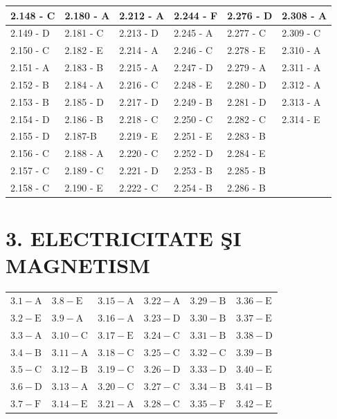 \documentclass[10pt]{article}
\begin{document}
\begin{center}
\begin{tabular}{|l|l|l|l|l|l|}
\hline
2.148 - C & 2.180 - A & 2.212 - A & 2.244 - F & 2.276 - D & 2.308 - A \\
\hline
2.149 - D & 2.181 - C & 2.213 - D & 2.245 - A & 2.277 - C & 2.309 - C \\
\hline
2.150 - C & 2.182 - E & 2.214 - A & 2.246 - C & 2.278 - E & 2.310 - A \\
\hline
2.151 - A & 2.183 - B & 2.215 - A & 2.247 - D & 2.279 - A & 2.311 - A \\
\hline
2.152 - B & 2.184 - A & 2.216 - C & 2.248 - E & 2.280 - D & 2.312 - A \\
\hline
2.153 - B & 2.185 - D & 2.217 - D & 2.249 - B & 2.281 - D & 2.313 - A \\
\hline
2.154 - D & 2.186 - B & 2.218 - C & 2.250 - C & 2.282 - C & 2.314 - E \\
\hline
2.155 - D & 2.187-B & 2.219 - E & 2.251 - E & 2.283 - B &  \\
\hline
2.156 - C & 2.188 - A & 2.220 - C & 2.252 - D & 2.284 - E &  \\
\hline
2.157 - C & 2.189 - C & 2.221 - D & 2.253 - B & 2.285 - B &  \\
\hline
2.158 - C & 2.190 - E & 2.222 - C & 2.254 - B & 2.286 - B &  \\
\hline
\end{tabular}
\end{center}

\section*{3. ELECTRICITATE ŞI MAGNETISM}
\begin{center}
\begin{tabular}{llllll}
$3.1-\mathrm{A}$ & $3.8-\mathrm{E}$ & $3.15-\mathrm{A}$ & $3.22-\mathrm{A}$ & $3.29-\mathrm{B}$ & $3.36-\mathrm{E}$ \\
$3.2-\mathrm{E}$ & $3.9-\mathrm{A}$ & $3.16-\mathrm{A}$ & $3.23-\mathrm{D}$ & $3.30-\mathrm{B}$ & $3.37-\mathrm{E}$ \\
$3.3-\mathrm{A}$ & $3.10-\mathrm{C}$ & $3.17-\mathrm{E}$ & $3.24-\mathrm{C}$ & $3.31-\mathrm{B}$ & $3.38-\mathrm{D}$ \\
$3.4-\mathrm{B}$ & $3.11-\mathrm{A}$ & $3.18-\mathrm{C}$ & $3.25-\mathrm{C}$ & $3.32-\mathrm{C}$ & $3.39-\mathrm{B}$ \\
$3.5-\mathrm{C}$ & $3.12-\mathrm{B}$ & $3.19-\mathrm{C}$ & $3.26-\mathrm{D}$ & $3.33-\mathrm{D}$ & $3.40-\mathrm{E}$ \\
$3.6-\mathrm{D}$ & $3.13-\mathrm{A}$ & $3.20-\mathrm{C}$ & $3.27-\mathrm{C}$ & $3.34-\mathrm{B}$ & $3.41-\mathrm{B}$ \\
$3.7-\mathrm{F}$ & $3.14-\mathrm{E}$ & $3.21-\mathrm{A}$ & $3.28-\mathrm{C}$ & $3.35-\mathrm{F}$ & $3.42-\mathrm{E}$ \\
\end{tabular}
\end{center}
\end{document}
